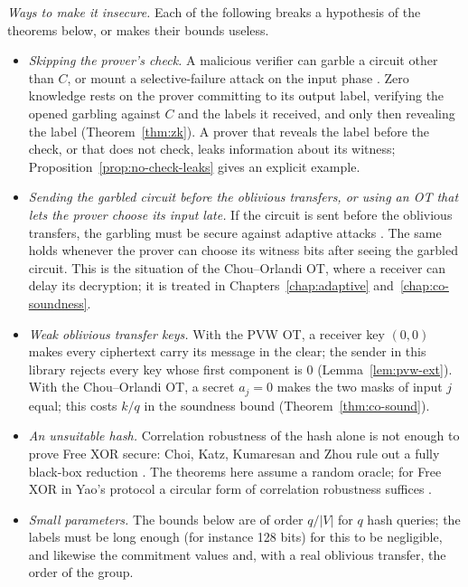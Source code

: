 \emph{Ways to make it insecure.} Each of the following breaks a hypothesis of the theorems below,
or makes their bounds useless.
\begin{itemize}
  \item \emph{Skipping the prover's check.} A malicious verifier can garble a circuit other than
  $C$, or mount a selective-failure attack on the input phase \cite[Sect.~1]{JKO13}. Zero knowledge
  rests on the prover committing to its output label, verifying the opened garbling against $C$
  and the labels it received, and only then revealing the label (Theorem~\ref{thm:zk}). A prover
  that reveals the label before the check, or that does not check, leaks information about its
  witness; Proposition~\ref{prop:no-check-leaks} gives an explicit example.
  \item \emph{Sending the garbled circuit before the oblivious transfers, or using an OT that lets
  the prover choose its input late.} If the circuit is sent before the oblivious transfers, the
  garbling must be secure against adaptive attacks \cite[Sect.~3, footnote~7]{JKO13}. The same
  holds whenever the prover can choose its witness bits after seeing the garbled circuit.
  This is the situation of the Chou--Orlandi OT, where a receiver can delay its decryption; it is
  treated in Chapters~\ref{chap:adaptive} and~\ref{chap:co-soundness}.
  \item \emph{Weak oblivious transfer keys.} With the PVW OT, a receiver key $(0, 0)$ makes every
  ciphertext carry its message in the clear; the sender in this library rejects every key whose
  first component is $0$ (Lemma~\ref{lem:pvw-ext}). With the Chou--Orlandi OT, a secret $a_j = 0$ makes the two masks of
  input $j$ equal; this costs $k/q$ in the soundness bound (Theorem~\ref{thm:co-sound}).
  \item \emph{An unsuitable hash.} Correlation robustness of the hash alone is not enough to prove
  Free XOR secure: Choi, Katz, Kumaresan and Zhou rule out a fully black-box reduction
  \cite[Sect.~3]{CKKZ12}. The theorems here assume a random oracle; for Free XOR in Yao's protocol
  a circular form of correlation robustness suffices \cite[Sect.~4]{CKKZ12}.
  \item \emph{Small parameters.} The bounds below are of order $q/|V|$ for $q$ hash queries; the
  labels must be long enough (for instance 128 bits) for this to be negligible, and likewise the
  commitment values and, with a real oblivious transfer, the order of the group.
\end{itemize}

